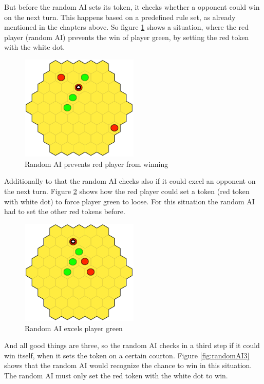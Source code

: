 \documentclass[english]{report}
\begin{document}
But before the random AI 
sets its token, it checks whether a opponent could win on the next turn. This happens based on a predefined rule set, as already mentioned in the chapters above. So figure \ref{fig:randomAI1} shows a situation, where the red player (random AI) prevents the win of player green, by setting the red token with the white dot.
\begin{figure}[ht]
\centering
\includegraphics[width=0.5\textwidth]{Abbildungen/randomAI1.png}
\caption{Random AI prevents red player from winning }
\label{fig:randomAI1}
\end{figure}
Additionally to that the random AI checks also if it could excel an opponent on the next turn. Figure \ref{fig:randomAI2} shows how the red player could set a token (red token with white dot) to force player green to loose. For this situation the random AI had to set the other red tokens before.
\begin{figure}[ht]
\centering
\includegraphics[width=0.5\textwidth]{Abbildungen/randomAI2.png}
\caption{Random AI excels player green }
\label{fig:randomAI2}
\end{figure}
And all good things are three, so the random AI checks in a third 
step if it could win itself, when it sets the token on a certain courton. Figure \ref{fig:randomAI3} shows that the random AI would recognize the chance to win in this situation. The random AI must only set the red token with the white dot to win.
\end{document}
